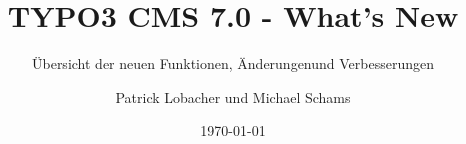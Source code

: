 %

%
%

\documentclass[t]{beamer}

\beamertemplatenavigationsymbolsempty

{
	\usetheme{typo3slides}
}

\title{TYPO3 CMS 7.0 - What's New}
\subtitle{Übersicht der neuen Funktionen, Änderungen\newline und Verbesserungen}
\author{
	\centerline{Patrick Lobacher und Michael Schams}
}
\date{\today}



\sharefont


\begingroup
	[default]
	\begin{frame}
		\titlepage
	\end{frame}
\endgroup


\section*{TYPO3 CMS 7.0 - What's New}
\begin{frame}[fragile]
	\frametitle{Kapitelübersicht}
	\framesubtitle{Kapitelübersicht}

	\begin{multicols}{2}
		\tableofcontents
	\end{multicols}

\end{frame}

